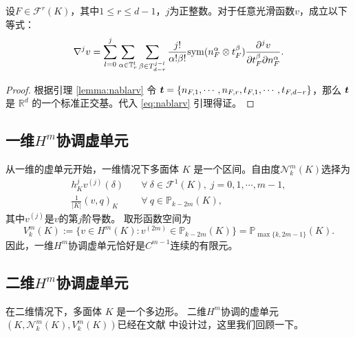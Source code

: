 \begin{lemma}
设$F\in\mathcal{F}^r(K)$，其中$1\leq r\leq d-1$，$j$为正整数。对于任意光滑函数$v$，成立以下等式：
\begin{equation}\label{eq:20210413}
    \nabla^jv=\sum_{l=0}^j\sum_{\alpha\in \mathbb{T}_r^l} \sum_{\beta\in
    T_{d-r}^{j-l}}\frac{j!}{\alpha!\beta!}\mathrm{sym}(n_F^{\alpha}\otimes
    t_F^{\beta})\frac{\partial^{j}v}{\partial t_F^{\beta}\partial
    n_F^{\alpha}}.
\end{equation} 
\end{lemma}
\begin{proof}
    根据引理 \ref{lemma:nablarv} 令 $\boldsymbol{t} = \{n_{F, 1}, \cdots,
    n_{F, r}, t_{F, 1}, \cdots, t_{F, d-r}\}$，那么 $\boldsymbol{t}$ 是 $\mathbb{R}^d$
    的一个标准正交基。代入 \eqref{eq:nablarv} 引理得证。
\end{proof}

\subsection{一维$H^m$协调虚单元}
从一维的虚单元开始，一维情况下多面体 $K$ 是一个区间。自由度$\mathcal N_k^m(K)$选择为
\begin{align}
h_K^jv^{(j)}(\delta) & \quad\forall~\delta\in\mathcal F^{1}(K), \;j=0,1,\cdots,m-1, \label{eq:cfmvem1ddof1}\\
\frac{1}{|K|}(v, q)_K & \quad\forall~q\in\mathbb P_{k-2m}(K), \label{eq:cfmvem1ddof2}
\end{align}
其中$v^{(j)}$是$v$的第$j$阶导数。
取形函数空间为
$$
V_k^m(K):=\{ v\in H^m(K): v^{(2m)}\in \mathbb P_{k-2m}(K)\}=\mathbb P_{\max\{k,2m-1\}}(K).
$$
因此，一维$H^m$协调虚单元恰好是$C^{m-1}$连续的有限元。

\subsection{二维$H^m$协调虚单元}

在二维情况下，多面体 $K$ 是一个多边形。
二维$H^m$协调的虚单元$(K, \mathcal N_k^m(K),
V_k^m(K))$已经在文献
\cite{BeiraoManzini2014,AntoniettiManziniVerani2020,
AntoniettiManziniScacchiVerani2021,BrezziMarini2013}中设计过，这里我们回顾一下。

